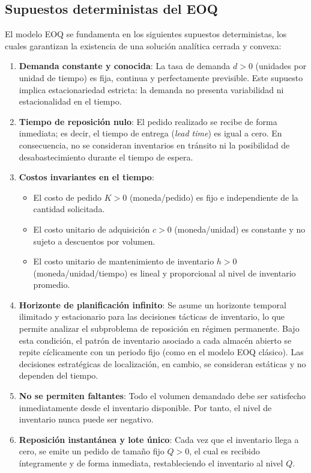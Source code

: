 \documentclass[
  spanish,
  us-letterpaper,
]{scrreprt}
\providecommand{\tightlist}{%
  \setlength{\itemsep}{0pt}\setlength{\parskip}{0pt}}
\numberwithin{equation}{section}
\begin{document}
\subsection{Supuestos deterministas del
EOQ}\label{supuestos-deterministas-del-eoq}

El modelo EOQ se fundamenta en los siguientes supuestos deterministas,
los cuales garantizan la existencia de una solución analítica cerrada y
convexa:

\begin{enumerate}
\def\labelenumi{\arabic{enumi}.}
\item
  \textbf{Demanda constante y conocida}: La tasa de demanda \(d > 0\)
  (unidades por unidad de tiempo) es fija, continua y perfectamente
  previsible. Este supuesto implica estacionariedad estricta: la demanda
  no presenta variabilidad ni estacionalidad en el tiempo.
\item
  \textbf{Tiempo de reposición nulo}: El pedido realizado se recibe de
  forma inmediata; es decir, el tiempo de entrega (\emph{lead time}) es
  igual a cero. En consecuencia, no se consideran inventarios en
  tránsito ni la posibilidad de desabastecimiento durante el tiempo de
  espera.
\item
  \textbf{Costos invariantes en el tiempo}:

  \begin{itemize}
  \tightlist
  \item
    El costo de pedido \(K > 0\) (moneda/pedido) es fijo e independiente
    de la cantidad solicitada.\\
  \item
    El costo unitario de adquisición \(c > 0\) (moneda/unidad) es
    constante y no sujeto a descuentos por volumen.\\
  \item
    El costo unitario de mantenimiento de inventario \(h > 0\)
    (moneda/unidad/tiempo) es lineal y proporcional al nivel de
    inventario promedio.
  \end{itemize}
\item
  \textbf{Horizonte de planificación infinito}: Se asume un horizonte
  temporal ilimitado y estacionario para las decisiones tácticas de
  inventario, lo que permite analizar el subproblema de reposición en
  régimen permanente. Bajo esta condición, el patrón de inventario
  asociado a cada almacén abierto se repite cíclicamente con un periodo
  fijo (como en el modelo EOQ clásico). Las decisiones estratégicas de
  localización, en cambio, se consideran estáticas y no dependen del
  tiempo.
\item
  \textbf{No se permiten faltantes}: Todo el volumen demandado debe ser
  satisfecho inmediatamente desde el inventario disponible. Por tanto,
  el nivel de inventario nunca puede ser negativo.
\item
  \textbf{Reposición instantánea y lote único}: Cada vez que el
  inventario llega a cero, se emite un pedido de tamaño fijo \(Q > 0\),
  el cual es recibido íntegramente y de forma inmediata, restableciendo
  el inventario al nivel \(Q\).
\end{enumerate}
\end{document}

